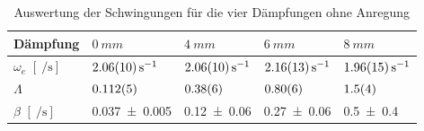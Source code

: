 \begin{table}[!htbp]
\centering
\begin{tabular}{|l|l|l|l|l|}
\hline 
Dämpfung & $\SI{0}{mm}$ & $\SI{4}{mm}$ & $\SI{6}{mm}$ & $\SI{8}{mm}$ \\
\hline
$\omega_e$ $[\SI{}{\per\second}]$ & $\SI{2,06\pm0,10}{\per\second}$ & $\SI{2,06\pm0,10}{\per\second}$ & $\SI{2,16\pm0,13}{\per\second}$ & $\SI{1,96\pm0,15}{\per\second}$ \\
\hline
$\Lambda$ & $\SI{0,112\pm0,005}{}$ & $\SI{0,38\pm0,06}{}$ & $\SI{0,80\pm0,06}{}$ & $\SI{1,5\pm0,4}{}$ \\
\hline
$\beta$ $[\SI{}{\per\second}]$ & \SI{0,037\pm0,005}{} & \SI{0,12\pm0,06}{} & \SI{0,27\pm0,06}{} & \SI{0,5\pm0,4}{} \\
\hline 
\end{tabular} 
\caption{\small{Auswertung der Schwingungen für die vier Dämpfungen ohne Anregung}}
\label{tab:1}
\end{table}
\newpage
